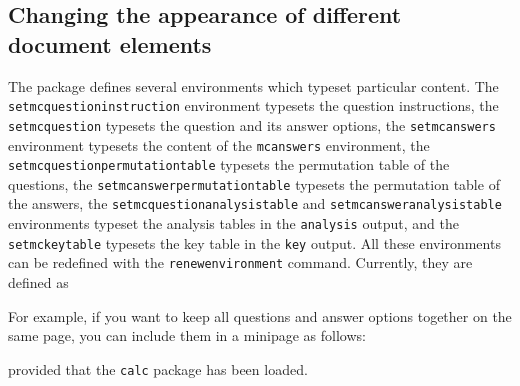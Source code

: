 \documentclass{article}
\begin{document}
\subsection{Changing the appearance of different document elements}

The package defines several environments which typeset particular content. The \verb$setmcquestioninstruction$ environment typesets the question instructions, the \verb$setmcquestion$ typesets the question and its answer options, the \verb$setmcanswers$ environment typesets the content of the \verb$mcanswers$ environment, the \verb$setmcquestionpermutationtable$ typesets the permutation table of the questions, the \verb$setmcanswerpermutationtable$ typesets the permutation table of the answers, the \verb$setmcquestionanalysistable$ and \verb$setmcansweranalysistable$ environments typeset the analysis tables in the \verb$analysis$ output, and the \verb$setmckeytable$ typesets the key table in the \verb$key$ output. All these environments can be redefined with the \verb$renewenvironment$ command. Currently, they are defined as 
\begin{code}
\newenvironment{setmcquestioninstruction}
  {\noindent}
  {}
\newenvironment{setmcquestion}
  {}  
  {}  
\newenvironment{setmcanswers}
  {\vspace{\baselineskip}}
  {}   
\newenvironment{setmcquestionpermutationtable}
  {\begin{center}
   \footnotesize\sffamily
   \setlength{\tabcolsep}{15pt}    }
  {\end{center}}  
\newenvironment{setmcanswerpermutationtable}
  {\begin{center}
   \setlength{\tabcolsep}{10pt}    }
  {\end{center}}
\newenvironment{setmcquestionanalysistable}
  {\begin{center}
   \setlength{\tabcolsep}{10pt}
   \footnotesize\sffamily          }
  {\end{center}}
\newenvironment{setmcansweranalysistable}
  {\begin{center}\setlength{\tabcolsep}{10pt}}
  {\end{center}}  
\newenvironment{setmckeytable}
  {\begin{center}\setlength{\tabcolsep}{10pt}}
  {\end{center}}
\end{code}

For example, if you want to keep all questions and answer options together on the same page, you can include them in a minipage as follows:
\begin{code}
\renewenvironment{setmcquestion}
  {\begin{minipage}[t]{\linewidth-\labelwidth}}
  {\end{minipage}\par} 
\end{code}
provided that the \verb$calc$ package has been loaded.
\end{document}
